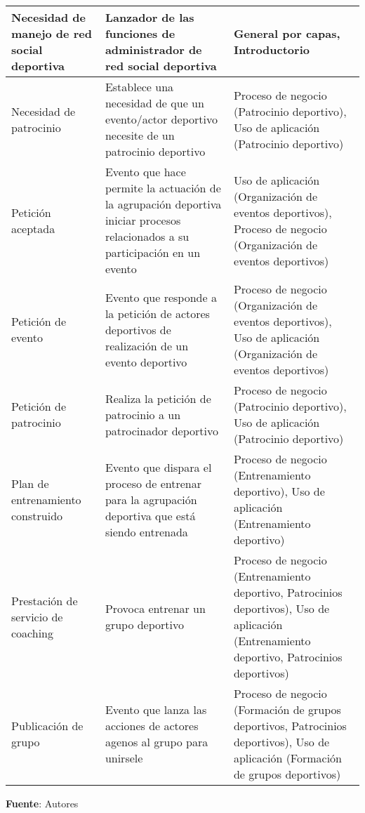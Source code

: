 \begin{center}
\begin{longtable}{|p{4cm}|p{7cm}|p{4cm}|}
		\hline
		Necesidad de manejo de red social deportiva & 
		Lanzador de las funciones de administrador de red social deportiva & 
		General por capas, Introductorio
		\\
		\hline
		Necesidad de patrocinio & 
		Establece una necesidad de que un evento/actor deportivo necesite de un patrocinio deportivo & 
		Proceso de negocio (Patrocinio deportivo), Uso de aplicación (Patrocinio deportivo)
		\\
		\hline
		Petición aceptada & 
		Evento que hace permite la actuación de la agrupación deportiva iniciar procesos relacionados a su participación en un evento & 
		Uso de aplicación (Organización de eventos deportivos), Proceso de negocio (Organización de eventos deportivos)
		\\
		\hline
		Petición de evento & 
		Evento que responde a la petición de actores deportivos de realización de un evento deportivo & 
		Proceso de negocio (Organización de eventos deportivos), Uso de aplicación (Organización de eventos deportivos)
		\\
		\hline
		Petición de patrocinio & 
		Realiza la petición de patrocinio a un patrocinador deportivo & 
		Proceso de negocio (Patrocinio deportivo), Uso de aplicación (Patrocinio deportivo)
		\\
		\hline
		Plan de entrenamiento construido & 
		Evento que dispara el proceso de entrenar para la agrupación deportiva que está siendo entrenada & 
		Proceso de negocio (Entrenamiento deportivo), Uso de aplicación (Entrenamiento deportivo)
		\\
		\hline
		Prestación de servicio de coaching & 
		Provoca entrenar un grupo deportivo & 
		Proceso de negocio (Entrenamiento deportivo, Patrocinios deportivos), Uso de aplicación (Entrenamiento deportivo, Patrocinios deportivos)
		\\
		\hline
		Publicación de grupo & 
		Evento que lanza las acciones de actores agenos al grupo para unirsele & 
		Proceso de negocio (Formación de grupos deportivos, Patrocinios deportivos), Uso de aplicación (Formación de grupos deportivos)
		\\
		\hline
		\end{longtable}
	\textbf{Fuente}: Autores
\end{center}

